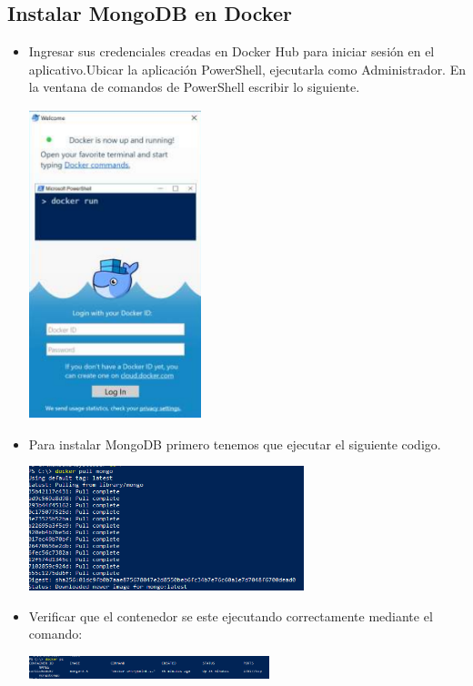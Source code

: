 \documentclass[%
 reprint,
 amsmath,amssymb,
 aps,
]{revtex4-1}
\begin{document}
\subsection{Instalar MongoDB en Docker}
     \begin{itemize}
                     \item Ingresar sus credenciales creadas en Docker Hub para iniciar sesión en el aplicativo.Ubicar la aplicación PowerShell, ejecutarla como Administrador. En la ventana de comandos de PowerShell escribir lo siguiente.
                     \begin{center}
		\includegraphics[width=5cm]{./Imagenes/8}
		\end{center}	
		\item Para instalar MongoDB primero tenemos que ejecutar el siguiente codigo.
                     \begin{center}
		\includegraphics[width=8cm]{./Imagenes/14}
		\end{center}	
		\item Verificar que el contenedor se este ejecutando correctamente mediante el comando:
                     \begin{center}
		\includegraphics[width=7cm]{./Imagenes/9}

\end{center}
\end{itemize}
\end{document}
